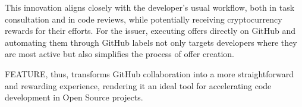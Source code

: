 \documentclass[
	a4paper, %
	10pt, %
	unnumberedsections, %
	twoside, %
]{LTJournalArticle}
\begin{document}
This innovation aligns closely with the developer's usual workflow, both in task consultation and in code reviews, while potentially receiving cryptocurrency rewards for their efforts. For the issuer, executing offers directly on GitHub and automating them through GitHub labels not only targets developers where they are most active but also simplifies the process of offer creation.

FEATURE, thus, transforms GitHub collaboration into a more straightforward and rewarding experience, rendering it an ideal tool for accelerating code development in Open Source projects.
\end{document}
